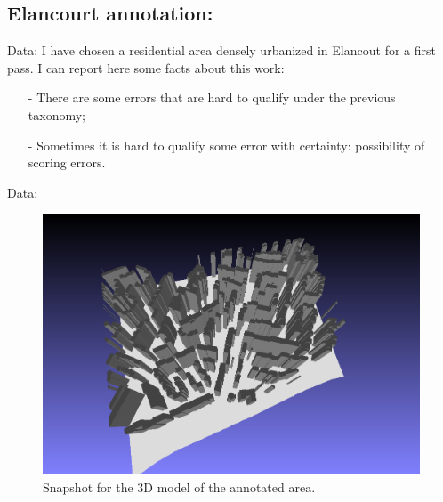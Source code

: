\documentclass[9pt]{beamer}
\begin{document}
	\subsection[annotation]{Elancourt annotation:}
	\begin{frame}{Data:}
		I have chosen a residential area densely urbanized in Elancout for a first pass. I can report here some facts about this work:
		\begin{itemize}
			\item[-] There are some errors that are hard to qualify under the previous taxonomy;
			\item[-] Sometimes it is hard to qualify some error with certainty: possibility of scoring errors.
		\end{itemize}
	\end{frame}

	\begin{frame}{Data:}
		\begin{figure}
			\begin{center}
				\caption{\label{img::snapshot} Snapshot for the 3D model of the annotated area.}
				\includegraphics[scale=.2]{snapshot00.png}
			\end{center}
		\end{figure}
	\end{frame}
\end{document}
